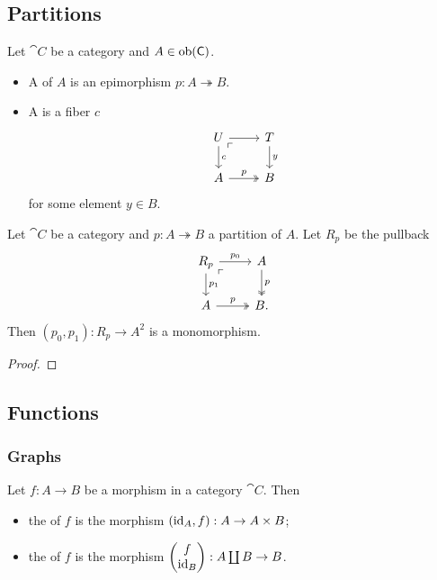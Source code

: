 \subsection{Partitions}
\begin{definition}
Let $\cat{C}$ be a category and $A\in\operatorname{ob}(\mathsf{C})$.
\begin{itemize}
\item A  of $A$ is an epimorphism $p: A \twoheadrightarrow B$.
\item A  is a fiber $c$
\[ \begin{tikzcd}
U \ar[d, "c"]\ar[r] \pbCorner & T \ar[d, "y"] \\
A \ar[r, twoheadrightarrow, "p"] & B
\end{tikzcd} \]
for some element $y\in B$.
\end{itemize}
\end{definition}

\begin{proposition}
Let $\cat{C}$ be a category and $p: A \twoheadrightarrow B$ a partition of $A$. Let $R_p$ be the pullback
\[ \begin{tikzcd}
R_p \ar[d, "{p_1}"]\ar[r, "{p_0}"] \pbCorner & A \ar[d, twoheadrightarrow, "p"] \\
A \ar[r, twoheadrightarrow, "p"] & B.
\end{tikzcd} \]
Then $(p_0, p_1): R_p \to A^2$ is a monomorphism.
\end{proposition}
\begin{proof}

\end{proof}

\subsection{Functions}
\subsubsection{Graphs}
\begin{definition}
Let $f: A\to B$ be a morphism in a category $\cat{C}$. Then
\begin{itemize}
\item the  of $f$ is the morphism $(\operatorname{id}_A, f): A\to A\times B$;
\item the  of $f$ is the morphism $\begin{pmatrix}
f \\ \operatorname{id}_B
\end{pmatrix}: A\coprod B \to B$.
\end{itemize}
\end{definition}

